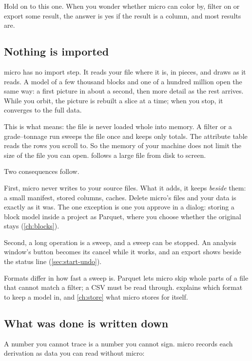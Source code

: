 Hold on to this one. When you wonder whether micro can color by, filter on or export some result, the answer is yes if the result is a column, and most results are.

\subsection{Nothing is imported}\label{sec:micro-streaming}
micro has no import step. It reads your file where it is, in pieces, and draws as it reads. A model of a few thousand blocks and one of a hundred million open the same way: a first picture in about a second, then more detail as the rest arrives. While you orbit, the picture is rebuilt a slice at a time; when you stop, it converges to the full data.

This is what  means: the file is never loaded whole into memory. A filter or a grade–tonnage run sweeps the file once and keeps only totals. The attribute table reads the rows you scroll to. So the memory of your machine does not limit the size of the file you can open.  follows a large file from disk to screen.

Two consequences follow.

First, micro never writes to your source files. What it adds, it keeps \emph{beside} them: a small manifest, stored columns, caches. Delete micro's files and your data is exactly as it was. The one exception is one you approve in a dialog: storing a block model inside a project as Parquet, where you choose whether the original stays (\cref{ch:blocks}).

Second, a long operation is a sweep, and a sweep can be stopped. An analysis window's  button becomes its cancel while it works, and an export shows  beside the status line (\cref{sec:start-undo}).

\begin{note}
Formats differ in how fast a sweep is. Parquet lets micro skip whole parts of a file that cannot match a filter; a CSV must be read through.  explains which format to keep a model in, and \cref{ch:store} what micro stores for itself.
\end{note}

\subsection{What was done is written down}\label{sec:micro-provenance}
A number you cannot trace is a number you cannot sign. micro records each derivation as data you can read without micro:

